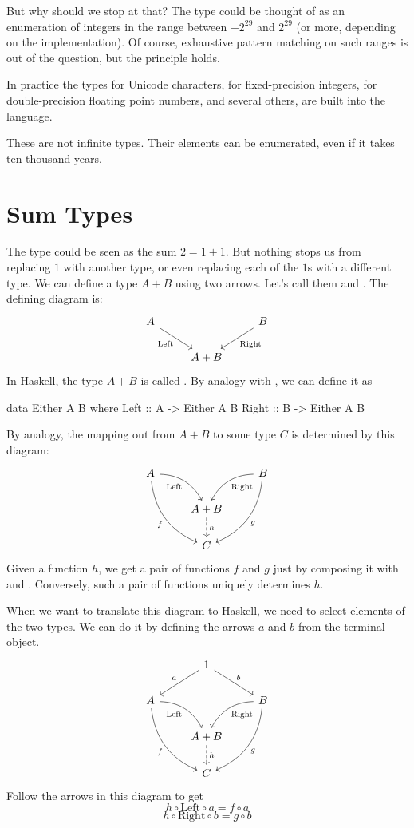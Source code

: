 \documentclass[DaoFP]{subfiles}
\begin{document}
But why should we stop at that? The type  could be thought of as an enumeration of integers in the range between $-2^{29}$ and $2^{29}$ (or more, depending on the implementation). Of course, exhaustive pattern matching on such ranges is out of the question, but the principle holds. 

In practice the types  for Unicode characters,  for fixed-precision integers,  for double-precision floating point numbers, and several others, are built into the language.

These are not infinite types. Their elements can be enumerated, even if it takes ten thousand years.

\section{Sum Types}

The  type could be seen as the sum $2 = 1 + 1$. But nothing stops us from replacing $1$ with another type, or even replacing each of the $1$s with a different type. We can define a type $A + B$ using two arrows. Let's call them  and . The defining diagram is:
\[
 \begin{tikzcd}
 A
 \arrow[dr,  "\text{Left}"']
 && B
 \arrow[dl, "\text{Right}"]
 \\
&A + B
 \end{tikzcd}
\]
In Haskell, the type $A + B$ is called . By analogy with , we can define it as
\begin{haskell}
data Either A B where
  Left  :: A -> Either A B
  Right :: B -> Either A B
\end{haskell}

By analogy, the mapping out from $A + B$ to some type $C$ is determined by this diagram:
\[
 \begin{tikzcd}
 A
 \arrow[dr,  bend left, "\text{Left}"']
 \arrow[ddr, bend right, "f"']
 && B
 \arrow[dl, bend right, "\text{Right}"]
 \arrow[ddl, bend left, "g"]
 \\
&A + B
\arrow[d, dashed, "h"]
\\
& C
 \end{tikzcd}
\]
Given a function $h$, we get a pair of functions $f$ and $g$ just by composing it with  and . Conversely, such a pair of functions uniquely determines $h$. 

When we want to translate this diagram to Haskell, we need to select elements of the two types. We can do it by defining the arrows $a$ and $b$ from the terminal object. 
\[
 \begin{tikzcd}
 &1
 \arrow[ld, "a"']
 \arrow[rd, "b"]
 \\
 A
 \arrow[dr,  bend left, "\text{Left}"']
 \arrow[ddr, bend right, "f"']
 && B
 \arrow[dl, bend right, "\text{Right}"]
 \arrow[ddl, bend left, "g"]
 \\
&A + B
\arrow[d, dashed, "h"]
\\
& C
 \end{tikzcd}
\]
Follow the arrows in this diagram to get
\[h \circ \text{Left} \circ a = f \circ a\]
\[h \circ \text{Right} \circ b = g \circ b\]
\end{document}
